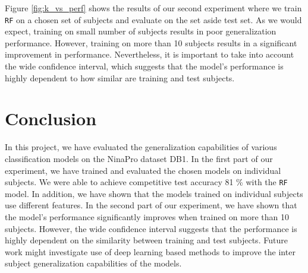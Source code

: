 \documentclass[10pt]{article}
\begin{document}
Figure \ref{fig:k_vs_perf} shows the results of our second experiment where we train \texttt{RF}
on a chosen set of subjects and evaluate on the set aside test set. As we would expect, training 
on small number of subjects results in poor generalization performance. However, 
training on more than 10 subjects results in a significant improvement in performance. Nevertheless,
it is important to take into account the wide confidence interval, which suggests that the model's performance
is highly dependent to how similar are training and test subjects.


\section{Conclusion}
In this project, we have evaluated the generalization capabilities of various classification models on the NinaPro dataset DB1.
In the first part of our experiment, we have trained and evaluated the chosen models on individual subjects. We were able to achieve
competitive test accuracy 81 \% with the \texttt{RF} model. In addition, we have shown that the models trained on individual subjects
use different features. In the second part of our experiment, we have shown that the model's performance significantly improves
when trained on more than 10 subjects. However, the wide confidence interval suggests that the performance is highly dependent 
on the similarity between training and test subjects. Future work might investigate use of deep learning based methods to improve
the inter subject generalization capabilities of the models.

\newpage


\end{document}
